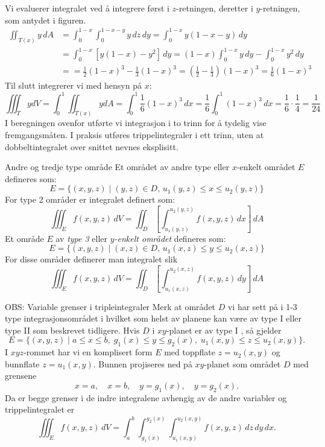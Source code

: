 \begin{eks}{}
 Vi evaluerer integralet ved å integrere først i \(z\)-retningen, deretter i \(y\)-retningen, som antydet i figuren.
\begin{align*}
\iint_{T(x)} y \, dA &= \int_0^{1 - x} \int_0^{1 - x - y} y \, dz \, dy = \int_0^{1 - x} y(1 - x - y) \, dy\\
&= \int_0^{1 - x} \left[y(1 - x) - y^2\right] \, dy 
= (1 - x) \int_0^{1 - x} y \, dy - \int_0^{1 - x} y^2 \, dy\\
&= = \frac{1}{2}(1 - x)^3 - \frac{1}{3}(1 - x)^3 
= \left( \frac{1}{2} - \frac{1}{3} \right)(1 - x)^3 
= \frac{1}{6}(1 - x)^3
\end{align*}
Til slutt integrerer vi med hensyn på \(x\):
\[
\iiint_T y dV = \int_0^1 \iint_{T(x)} y dA= \int_0^1 \frac{1}{6}(1 - x)^3 \, dx = \frac{1}{6} \int_0^1 (1 - x)^3 \, dx
= \frac{1}{6} \cdot \frac{1}{4} = \frac{1}{24}
\]
I beregningen ovenfor utførte vi integrasjon i to trinn for å tydelig vise fremgangsmåten. I praksis utføres trippelintegraler i ett trinn, uten at dobbeltintegralet over snittet nevnes eksplisitt.
\label{ex:tetrahedron}
\end{eks}

\begin{defn}{Andre og tredje type område}
Et området av andre type eller $x$-enkelt området $E$ defineres som:
\[
E = \{(x, y, z) \mid (y, z) \in D,\, u_1(y, z) \leq x \leq u_2(y, z)\}
\]
For type 2 områder er integralet definert som:
\[
\iiint_E f(x, y, z)\, dV = \iint_D \left[\int_{u_1(y,z)}^{u_2(y,z)} f(x, y, z)\, dx\right]\, dA
\]
Et område  $E$ av \emph{type 3} eller $y$\emph{-enkelt området} defineres som:
\[
E = \{(x, y, z) \mid (x, z) \in D,\, u_1(x, z) \leq y \leq u_2(x, z)\}
\]
For disse områder definerer man integralet slik 
\[
\iiint_E f(x, y, z)\, dV = \iint_D \left[\int_{u_1(x,z)}^{u_2(x,z)} f(x, y, z)\, dy\right]\, dA
\]
\end{defn}

\begin{rem}{OBS: Variable grenser i tripleintegraler}
Merk at området $D$ vi har sett på i 1-3 type integrasjonsområdet i hvilket som helst av planene kan være av type I eller type II som beskrevet tidligere. 
Hvis $D$ i $xy$-planet er av type I , så gjelder
\[
E = \{(x,y,z) \mid a \leq x \leq b, \; g_{1}(x) \leq y \leq g_{2}(x), \; u_{1}(x,y) \leq z \leq u_{2}(x,y) \}.
\]
I $xyz$-rommet har vi en komplisert form $E$ med toppflate $z = u_{2}(x,y)$ og bunnflate $z = u_{1}(x,y)$. Bunnen projiseres ned på $xy$-planet som området $D$ med grensene 
\[
x = a, \quad x = b, \quad y = g_{1}(x), \quad y = g_{2}(x).
\]
Da er begge grenser i de indre integralene avhengig av de andre variabler og trippelintegralet er
\[
\iiint_{E} f(x,y,z) \, dV 
= \int_{a}^{b} \int_{g_{1}(x)}^{g_{2}(x)} \int_{u_{1}(x,y)}^{u_{2}(x,y)} 
f(x,y,z) \, dz \, dy \, dx.
\]
\end{rem}



